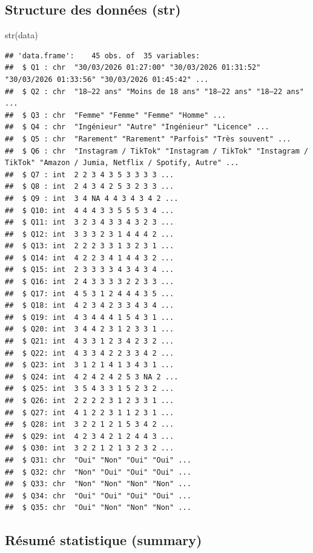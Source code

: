 \documentclass[
]{article}
\newenvironment{Shaded}{\begin{snugshade}}{\end{snugshade}}
\newcommand{\FunctionTok}[1]{\textcolor[rgb]{0.00,0.00,0.00}{#1}}
\newcommand{\NormalTok}[1]{#1}
\begin{document}
\hypertarget{structure-des-donnuxe9es-str}{%
\subsection{Structure des données
(str)}\label{structure-des-donnuxe9es-str}}

\begin{Shaded}
\begin{Highlighting}[]
\FunctionTok{str}\NormalTok{(data)}
\end{Highlighting}
\end{Shaded}

\begin{verbatim}
## 'data.frame':    45 obs. of  35 variables:
##  $ Q1 : chr  "30/03/2026 01:27:00" "30/03/2026 01:31:52" "30/03/2026 01:33:56" "30/03/2026 01:45:42" ...
##  $ Q2 : chr  "18–22 ans" "Moins de 18 ans" "18–22 ans" "18–22 ans" ...
##  $ Q3 : chr  "Femme" "Femme" "Femme" "Homme" ...
##  $ Q4 : chr  "Ingénieur" "Autre" "Ingénieur" "Licence" ...
##  $ Q5 : chr  "Rarement" "Rarement" "Parfois" "Très souvent" ...
##  $ Q6 : chr  "Instagram / TikTok" "Instagram / TikTok" "Instagram / TikTok" "Amazon / Jumia, Netflix / Spotify, Autre" ...
##  $ Q7 : int  2 2 3 4 3 5 3 3 3 3 ...
##  $ Q8 : int  2 4 3 4 2 5 3 2 3 3 ...
##  $ Q9 : int  3 4 NA 4 4 3 4 3 4 2 ...
##  $ Q10: int  4 4 4 3 3 5 5 5 3 4 ...
##  $ Q11: int  3 2 3 4 3 3 4 3 2 3 ...
##  $ Q12: int  3 3 3 2 3 1 4 4 4 2 ...
##  $ Q13: int  2 2 2 3 3 1 3 2 3 1 ...
##  $ Q14: int  4 2 2 3 4 1 4 4 3 2 ...
##  $ Q15: int  2 3 3 3 3 4 3 4 3 4 ...
##  $ Q16: int  2 4 3 3 3 3 2 2 3 3 ...
##  $ Q17: int  4 5 3 1 2 4 4 4 3 5 ...
##  $ Q18: int  4 2 3 4 2 3 3 4 3 4 ...
##  $ Q19: int  4 3 4 4 4 1 5 4 3 1 ...
##  $ Q20: int  3 4 4 2 3 1 2 3 3 1 ...
##  $ Q21: int  4 3 3 1 2 3 4 2 3 2 ...
##  $ Q22: int  4 3 3 4 2 2 3 3 4 2 ...
##  $ Q23: int  3 1 2 1 4 1 3 4 3 1 ...
##  $ Q24: int  4 2 4 2 4 2 5 3 NA 2 ...
##  $ Q25: int  3 5 4 3 3 1 5 2 3 2 ...
##  $ Q26: int  2 2 2 2 3 1 2 3 3 1 ...
##  $ Q27: int  4 1 2 2 3 1 1 2 3 1 ...
##  $ Q28: int  3 2 2 1 2 1 5 3 4 2 ...
##  $ Q29: int  4 2 3 4 2 1 2 4 4 3 ...
##  $ Q30: int  3 2 2 1 2 1 3 2 3 2 ...
##  $ Q31: chr  "Oui" "Non" "Oui" "Oui" ...
##  $ Q32: chr  "Non" "Oui" "Oui" "Oui" ...
##  $ Q33: chr  "Non" "Non" "Non" "Non" ...
##  $ Q34: chr  "Oui" "Oui" "Oui" "Oui" ...
##  $ Q35: chr  "Oui" "Non" "Non" "Non" ...
\end{verbatim}

\hypertarget{ruxe9sumuxe9-statistique-summary}{%
\subsection{Résumé statistique
(summary)}\label{ruxe9sumuxe9-statistique-summary}}
\end{document}
